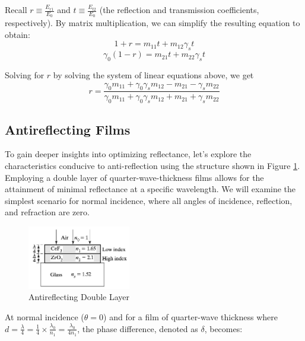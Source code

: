 Recall $r \equiv \frac{E_{r1}}{E_0}$ and $t \equiv \frac{E_{t2}}{E_0}$ (the reflection and transmission coefficients, respectively). By matrix multiplication, we can simplify the resulting equation to obtain: %
    \begin{equation}
    1 + r = m_{11}t + m_{12}\gamma_st
    \end{equation}
    \begin{equation}
    \gamma_0(1 - r) = m_{21}t + m_{22}\gamma_st
    \end{equation}

Solving for $r$ by solving the system of linear equations above, we get
    \begin{equation}\label{reflection coefficient in terms of transfer matrix terms}
    r=\frac{\gamma_0m_{11} + \gamma_0\gamma_sm_{12} - m_{21} - \gamma_sm_{22}}{\gamma_0m_{11} + \gamma_0\gamma_sm_{12} + m_{21} + \gamma_sm_{22}}
    \end{equation}

\subsection{Antireflecting Films}
To gain deeper insights into optimizing reflectance, let's explore the characteristics conducive to anti-reflection using the structure shown in Figure \ref{Sample Antireflecting Double Layer}. Employing a double layer of quarter-wave-thickness films allows for the attainment of minimal reflectance at a specific wavelength. We will examine the simplest scenario for normal incidence, where all angles of incidence, reflection, and refraction are zero.

\begin{figure}[ht!]
  \centering
  \includegraphics[width=0.4\textwidth]{Chapters/Figures/Chapter 2 Figures/Antireflecting Double Layer.jpeg}
  \caption{Antireflecting Double Layer}
  \label{Sample Antireflecting Double Layer}
\end{figure}

At normal incidence ($\theta=0$) and for a film of quarter-wave thickness where $d=\frac{\lambda}{4} = \frac{1}{4} \times \frac{\lambda_0}{n_1} = \frac{\lambda_0}{4n_1}$, the phase difference, denoted as $\delta$, becomes: 

